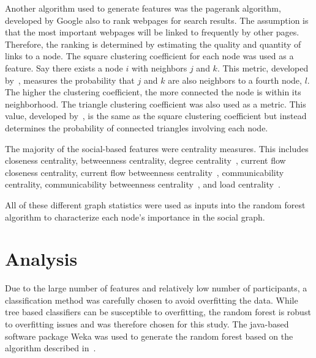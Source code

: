 \documentclass[10pt,twocolumn,conference]{IEEEtran}
\begin{document}
Another algorithm used to generate features was the pagerank algorithm, developed by Google 
\cite{page_pagerank_1999} also to rank webpages for search results.  The assumption is that the most important webpages will be linked to frequently by other pages.  Therefore, the ranking is determined by estimating the quality and quantity of links to a node.  The square clustering coefficient for each node was used as a feature. Say there exists a node $i$ with neighbors $j$ and $k$. This metric, developed by~\cite{lind_cycles_2005}, measures the probability that $j$ and $k$ are also neighbors to a fourth node, $l$.  The higher the clustering coefficient, the more connected the node is within its neighborhood.  The triangle clustering coefficient was also used as a metric.  This value, developed by~\cite{saramaki_generalizations_2007}, is the same as the square clustering coefficient but instead determines the probability of connected triangles involving each node.

The majority of the social-based features were centrality measures.  This includes closeness centrality, betweenness centrality, degree centrality~\cite{borgatti2011analyzing}, current flow closeness centrality, current flow betweenness centrality~\cite{brandes2005centrality}, communicability centrality, communicability betweenness centrality~\cite{estrada2008communicability}, and load centrality~\cite{newman2001scientific}.

All of these different graph statistics were used as inputs into the random forest algorithm to characterize each node's importance in the social graph.


\section{Analysis} \label{Analysis}

Due to the large number of features and relatively low number of participants, a classification method was carefully chosen to avoid overfitting the data.  While tree based classifiers can be susceptible to overfitting, the random forest is robust to overfitting issues and was therefore chosen for this study.  The java-based software package Weka was used to generate the random forest based on the algorithm described in~\cite{Breiman2001}.
\end{document}
